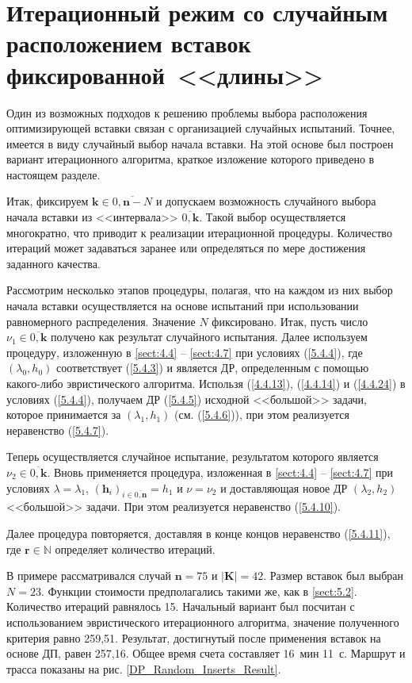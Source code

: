 
\section{
  Итерационный режим
  со случайным расположением вставок
  фиксированной~<<длины>>
}
\label{sect:5.5}
\setcounter{equation}{0}

Один из возможных подходов к решению проблемы выбора расположения оптимизирующей
вставки связан с организацией случайных испытаний.
Точнее, имеется в виду случайный выбор начала вставки.
На этой основе был построен вариант итерационного алгоритма,
краткое изложение которого приведено в настоящем разделе.

Итак, фиксируем
$\mathbf{k}\in \overline{0,\mathbf{n}-N}$
и допускаем возможность
случайного выбора начала вставки из <<интервала>> $\overline{0,\mathbf{k}}$.
Такой выбор осуществляется многократно,
что приводит к реализации итерационной процедуры.
Количество итераций может задаваться заранее или определяться
по мере достижения заданного качества.

Рассмотрим несколько этапов процедуры,
полагая, что на каждом из них выбор начала вставки осуществляется
на основе испытаний при использовании равномерного распределения.
Значение $N$ фиксировано.
Итак, пусть число
$\nu_1\in \overline{0,\mathbf{k}}$
получено как результат случайного испытания.
Далее используем процедуру, изложенную в \ref{sect:4.4} -- \ref{sect:4.7}
при условиях (\ref{5.4.4}),
где $(\lambda_0,h_0)$
соответствует (\ref{5.4.3})
и является ДР, определенным с помощью какого-либо эвристического алгоритма.
Использя
(\ref{4.4.13}), (\ref{4.4.14}) и (\ref{4.4.24})
в условиях (\ref{5.4.4}),
получаем ДР (\ref{5.4.5}) исходной <<большой>> задачи,
которое принимается за
$(\lambda_1,h_1)$
(см. (\ref{5.4.6})),
при этом реализуется неравенство (\ref{5.4.7}).

Теперь осуществляется случайное испытание,
результатом которого является
$\nu_2\in \overline{0,\mathbf{k}}$.
Вновь применяется процедура, изложенная
в \ref{sect:4.4} -- \ref{sect:4.7}
при условиях
$\lambda=\lambda_1$,
$(\mathbf{h}_i)_{i\in \overline{0,\mathbf{n}}}=h_1$ и
$\nu=\nu_2$
и доставляющая новое ДР
$(\lambda_2,h_2)$ <<большой>> задачи.
При этом реализуется неравенство
(\ref{5.4.10}).

Далее процедура повторяется,
доставляя в конце концов неравенство (\ref{5.4.11}),
где $\mathbf{r}\in \mathbb{N}$ определяет количество итераций.

В примере рассматривался случай
$\mathbf{n}=75$ и $|\mathbf{K}|=42$.
Размер вставок был выбран
$N=23$.
Функции стоимости предполагались такими же,
как в
\ref{sect:5.2}.
Количество итераций равнялось 15.
Начальный вариант был посчитан с использованием
эвристического итерационного алгоритма,
значение полученного критерия равно 259,51.
Результат, достигнутый после применения вставок на основе ДП, равен 257,16.
Общее время счета составляет 16~мин 11~с.
Маршрут и трасса показаны на рис.
\ref{DP_Random_Inserts_Result}.


